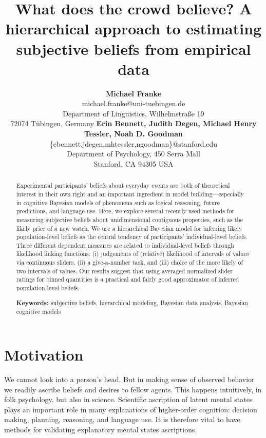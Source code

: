 \documentclass[10pt,letterpaper]{article}
\title{What does the crowd believe? A hierarchical approach to estimating subjective beliefs
  from empirical data}
\author{{\large \bf Michael Franke} \\
  michael.franke@uni-tuebingen.de \\
  Department of Linguistics, Wilhelmstra\ss e 19 \\
 72074 T\"{u}bingen, Germany \AND 
 {\large \bf Erin Bennett, Judith Degen, Michael Henry Tessler, Noah D. Goodman}\\
     \{ebennett,jdegen,mhtessler,ngoodman\}@stanford.edu \\
     Department of Psychology, 450 Serra Mall \\
  Stanford, CA 94305 USA }
\begin{document}
\maketitle

\begin{abstract}
  Experimental participants' beliefs about everyday events are both of theoretical interest in their own right and an important ingredient in model building---especially in cognitive Bayesian models of
  phenomena such as logical reasoning, future predictions, and language use. Here, we explore
  several recently used methods for measuring subjective beliefs about unidimensional
  contiguous properties, such as the likely price of a new watch. We use a hierarchical
  Bayesian model for inferring likely population-level beliefs as the central tendency of
  participants' individual-level beliefs.  Three different dependent measures are related to
  individual-level beliefs through likelihood linking functions: (i) judgements of
  (relative) likelihood of intervals of values via continuous sliders, (ii) a give-a-number
  task, and (iii) choice of the more likely of two intervals of values. Our results suggest
  that using averaged normalized slider ratings for binned quantities is a practical and fairly
  good approximator of inferred population-level beliefs.

  \textbf{Keywords:} subjective beliefs, hierarchical modeling, Bayesian data analysis,
  Bayesian cognitive models
\end{abstract}




\section{Motivation}

We cannot look into a person's head. But in making sense of observed behavior we readily
ascribe beliefs and desires to fellow agents. This happens intuitively, in folk psychology, but
also in science. Scientific ascription of latent mental states plays an important role in many
explanations of higher-order cognition: decision making, planning, reasoning, and language
use. It is therefore vital to have methods for validating explanatory mental states
ascriptions.
\end{document}
